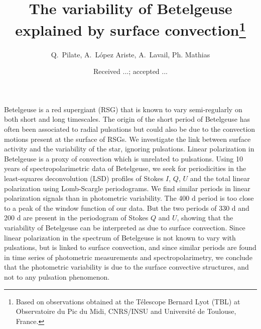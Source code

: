 \documentclass{aa}
\begin{document}
 


   \title{The variability  of Betelgeuse explained by surface convection\thanks{Based on observations obtained at the T\'elescope Bernard Lyot
   (TBL) at Observatoire du Pic du Midi, CNRS/INSU and Universit\'e de
   Toulouse, France.}}


    \author{{ Q.~Pilate},{ A.~López Ariste},{ A.~Lavail},{ Ph. Mathias} }


   \date{Received ...; accepted ...}

 
  \abstract
  {Betelgeuse is a red supergiant (RSG) that is known to vary semi-regularly on both short and long timescales. The origin of the short period of Betelgeuse has often been associated to radial pulsations but could also be due to the convection motions present at the surface of RSGs.}
   { We investigate the link between surface activity and the variability of the star, ignoring pulsations.   }
   {Linear polarization in Betelgeuse is a proxy of convection which is unrelated to pulsations. Using  10 years of spectropolarimetric data of Betelgeuse, we seek for periodicities in the least-squares deconvolution (LSD) profiles of Stokes $I$, $Q$, $U$ and the total linear polarization using  Lomb-Scargle periodograms. }
   {We find similar periods in linear polarization signals than in photometric variability. The 400 d period is too close to a peak of the window function of our data. But the two periods of 330 d and 200 d are present in the periodogram of Stokes $Q$ and $U$, showing that  the variability of Betelgeuse can be interpreted as due to  surface convection. }
   {Since linear polarization in the spectrum of Betelgeuse is not known to vary with pulsations, but is linked to surface convection, and since similar periods are found in time series of photometric measurements and spectropolarimetry, we conclude that the photometric variability is due to the surface convective structures, and not to any pulsation phenomenon.}
\end{document}
